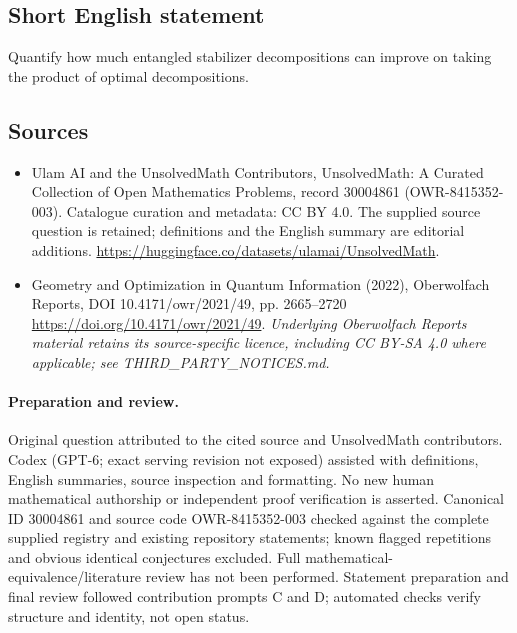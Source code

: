 \documentclass[11pt]{article}
\begin{document}
\subsection{Short English statement}
Quantify how much entangled stabilizer decompositions can improve on taking the product of optimal decompositions.
\subsection{Sources}
\begin{itemize}
\item[\hypertarget{source:30004861:1}{S1}] Ulam AI and the UnsolvedMath Contributors, UnsolvedMath: A Curated Collection of Open Mathematics Problems, record 30004861 (OWR-8415352-003). Catalogue curation and metadata: CC BY 4.0. The supplied source question is retained; definitions and the English summary are editorial additions.
\url{https://huggingface.co/datasets/ulamai/UnsolvedMath}.
\item[\hypertarget{source:30004861:2}{S2}] Geometry and Optimization in Quantum Information (2022), Oberwolfach Reports, DOI 10.4171/owr/2021/49, pp. 2665--2720
\url{https://doi.org/10.4171/owr/2021/49}.
\textit{Underlying Oberwolfach Reports material retains its source-specific licence, including CC BY-SA 4.0 where applicable; see THIRD\_PARTY\_NOTICES.md.}
\end{itemize}
\paragraph{Preparation and review.}
Original question attributed to the cited source and UnsolvedMath contributors. Codex (GPT-6; exact serving revision not exposed) assisted with definitions, English summaries, source inspection and formatting. No new human mathematical authorship or independent proof verification is asserted. Canonical ID 30004861 and source code OWR-8415352-003 checked against the complete supplied registry and existing repository statements; known flagged repetitions and obvious identical conjectures excluded. Full mathematical-equivalence/literature review has not been performed. Statement preparation and final review followed contribution prompts C and D; automated checks verify structure and identity, not open status.
\label{end:30004861}
\end{document}
